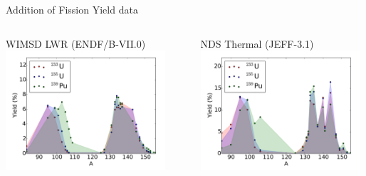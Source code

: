\documentclass[xcolor=x11names,compress]{beamer}
\begin{document}
\begin{frame}{Addition of Fission Yield data}
    \begin{columns}
        \begin{column}{0.45\textwidth}
            \begin{center}
                WIMSD LWR (ENDF/B-VII.0)
                \includegraphics[height=1.75in,clip]{yieldwimsd.pdf}
            \end{center}
  	    \end{column}
 	    \begin{column}{0.45\textwidth}
            \begin{center}
            NDS Thermal (JEFF-3.1)
            \includegraphics[height=1.75in,clip]{yieldnds.pdf}
            \end{center}
        \end{column}
    \end{columns}
\end{frame}
\end{document}

